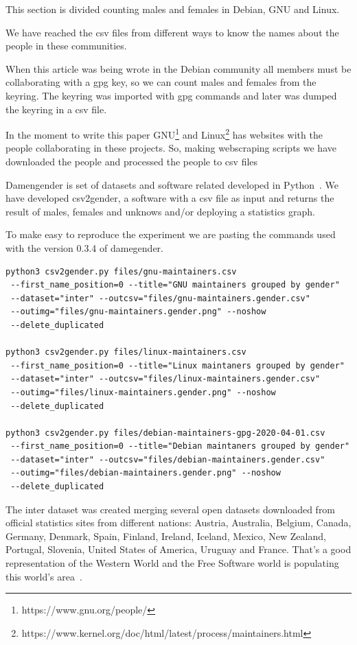 \documentclass[fleqn,10pt,lineno]{wlpeerj} %
\begin{document}
This section is divided counting males and females in Debian, GNU and
Linux.

We have reached the csv files from different ways to know the names
about the people in these communities.

When this article was being wrote in the Debian community all members
must be collaborating with a gpg key, so we can count males and females
from the keyring. The keyring was imported with gpg commands and later
was dumped the keyring in a csv file.

In the moment to write this paper
GNU\footnote{https://www.gnu.org/people/} and
Linux\footnote{https://www.kernel.org/doc/html/latest/process/maintainers.html}
has websites with the people collaborating in these projects. So,
making webscraping scripts we have downloaded the people and processed
the people to csv files

Damengender is set of datasets and software related developed in
Python~\cite{van2011python}. We have developed csv2gender, a software
with a csv file as input and returns the result of males, females and
unknows and/or deploying a statistics graph.

To make easy to reproduce the experiment we are pasting the commands
used with the version 0.3.4 of damegender.

\begin{verbatim}
python3 csv2gender.py files/gnu-maintainers.csv
 --first_name_position=0 --title="GNU maintainers grouped by gender"
 --dataset="inter" --outcsv="files/gnu-maintainers.gender.csv"
 --outimg="files/gnu-maintainers.gender.png" --noshow
 --delete_duplicated

python3 csv2gender.py files/linux-maintainers.csv
 --first_name_position=0 --title="Linux maintaners grouped by gender"
 --dataset="inter" --outcsv="files/linux-maintainers.gender.csv"
 --outimg="files/linux-maintainers.gender.png" --noshow
 --delete_duplicated

python3 csv2gender.py files/debian-maintainers-gpg-2020-04-01.csv
 --first_name_position=0 --title="Debian maintaners grouped by gender"
 --dataset="inter" --outcsv="files/debian-maintainers.gender.csv"
 --outimg="files/debian-maintainers.gender.png" --noshow
 --delete_duplicated
\end{verbatim}

The inter dataset was created merging several open datasets downloaded
from official statistics sites from different nations: Austria,
Australia, Belgium, Canada, Germany, Denmark, Spain, Finland, Ireland,
Iceland, Mexico, New Zealand, Portugal, Slovenia, United States of
America, Uruguay and France. That's a good representation of the
Western World and the Free Software world is populating this world's
area~\cite{gonzalez2008geographic}.
\end{document}
